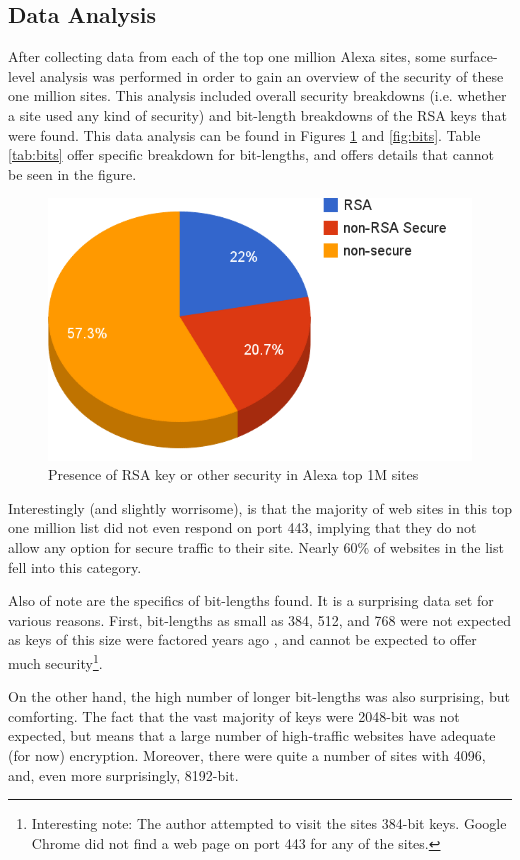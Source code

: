 \documentclass[12pt]{ucthesis}
\begin{document}
\subsection{Data Analysis}
After collecting data from each of the top one million Alexa sites, some
surface-level analysis was performed in order to gain an overview of the
security of these one million sites. This analysis included overall security
breakdowns (i.e. whether a site used any kind of security) and
bit-length breakdowns of the RSA keys that were found. This data analysis can
be found in Figures \ref{fig:certs} and \ref{fig:bits}. Table \ref{tab:bits}
offer specific breakdown for bit-lengths, and offers details that cannot be
seen in the figure.

\begin{figure}
   \centering
   \includegraphics[width=0.75\linewidth]{cert_security.png}
   \caption{Presence of RSA key or other security in Alexa top 1M sites}
   \label{fig:certs}
\end{figure}

Interestingly (and slightly worrisome), is that the majority of web sites in
this top one million list did not even respond on port 443, implying that
they do not allow any option for secure traffic to their site. Nearly 60\% of
websites in the list fell into this category.

Also of note are the specifics of bit-lengths found. It is a surprising data
set for various reasons. First, bit-lengths as small as 384, 512, and 768 were
not expected as keys of this size were factored years ago
\cite{rsa2007challenge}, and cannot be expected to offer much
security\footnote{Interesting note: The author attempted to visit the sites
384-bit keys. Google Chrome did not find a web page on port 443 for any of
the sites.}.

On the other hand, the high number of longer bit-lengths was also surprising,
but comforting. The fact that the vast majority of keys were 2048-bit was not
expected, but means that a large number of high-traffic websites have adequate
(for now) encryption. Moreover, there were quite a number of sites with 4096,
and, even more surprisingly, 8192-bit.
\end{document}
